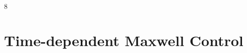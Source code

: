 \documentclass{article}
\DeclareMathOperator{\grad}{grad}
\DeclareMathOperator{\curl}{curl}
\DeclareMathOperator{\divergence}{div}
\newcommand{\R} {\mathbb R}
\newcommand{\HH}{\mathfrak H}
\newcommand{\Piop}{\boldsymbol\Pi}
\newcommand{\ip}[2]{\langle #1,#2\rangle}
\newcommand{\norm}[1]{\lVert #1\rVert}
\begin{document}

8%
%   

\section{Time-dependent Maxwell Control}
\label{sec:maxwell-topological}
\end{document}
